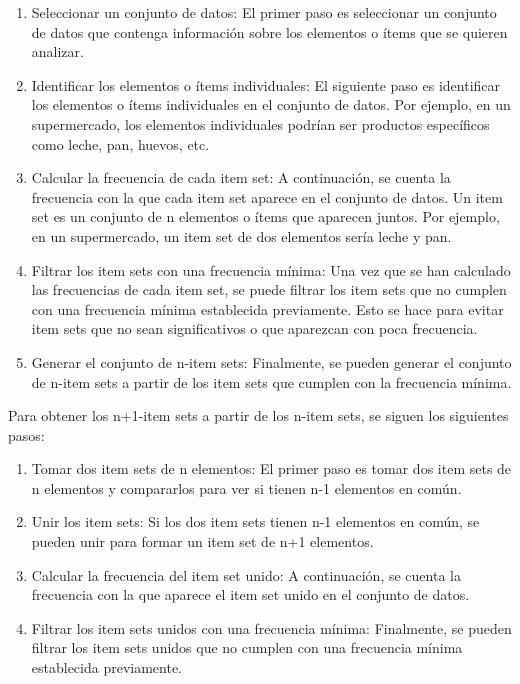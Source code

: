 \begin{enumerate}
    \item Seleccionar un conjunto de datos: El primer paso es seleccionar un conjunto de datos que contenga información sobre los elementos o ítems que se quieren analizar.
    \item Identificar los elementos o ítems individuales: El siguiente paso es identificar los elementos o ítems individuales en el conjunto de datos. Por ejemplo, en un supermercado, los elementos individuales podrían ser productos específicos como leche, pan, huevos, etc.
    \item Calcular la frecuencia de cada item set: A continuación, se cuenta la frecuencia con la que cada item set aparece en el conjunto de datos. Un item set es un conjunto de n elementos o ítems que aparecen juntos. Por ejemplo, en un supermercado, un item set de dos elementos sería leche y pan.
    \item Filtrar los item sets con una frecuencia mínima: Una vez que se han calculado las frecuencias de cada item set, se puede filtrar los item sets que no cumplen con una frecuencia mínima establecida previamente. Esto se hace para evitar item sets que no sean significativos o que aparezcan con poca frecuencia.
    \item Generar el conjunto de n-item sets: Finalmente, se pueden generar el conjunto de n-item sets a partir de los item sets que cumplen con la frecuencia mínima.
\end{enumerate}

Para obtener los n+1-item sets a partir de los n-item sets, se siguen los siguientes pasos:
\begin{enumerate}
    \item Tomar dos item sets de n elementos: El primer paso es tomar dos item sets de n elementos y compararlos para ver si tienen n-1 elementos en común.
    \item Unir los item sets: Si los dos item sets tienen n-1 elementos en común, se pueden unir para formar un item set de n+1 elementos.
    \item Calcular la frecuencia del item set unido: A continuación, se cuenta la frecuencia con la que aparece el item set unido en el conjunto de datos.
    \item Filtrar los item sets unidos con una frecuencia mínima: Finalmente, se pueden filtrar los item sets unidos que no cumplen con una frecuencia mínima establecida previamente. 
\end{enumerate}

